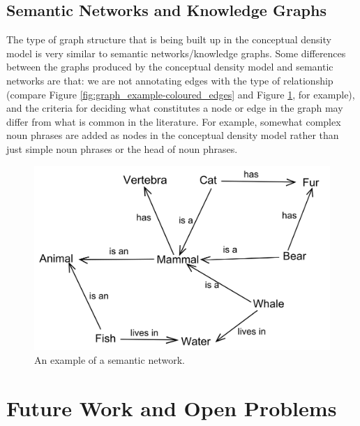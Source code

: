 \documentclass[12pt]{article}
\theoremstyle{grammarstyle}
\begin{document}
\subsection{Semantic Networks and Knowledge Graphs}
The type of graph structure that is being built up in the conceptual density model is very similar to semantic networks/knowledge graphs. Some differences between the graphs produced by the conceptual density model and semantic networks are that: we are not annotating edges with the type of relationship (compare Figure \ref{fig:graph_example-coloured_edges} and Figure \ref{fig:semantic_network_example}, for example), and the criteria for deciding what constitutes a node or edge in the graph may differ from what is common in the literature. For example, somewhat complex noun phrases are added as nodes in the conceptual density model rather than just simple noun phrases or the head of noun phrases.

\begin{figure}
    \centering
    \includegraphics[width=\linewidth]{reports/technical_report/latex/figures/semantic_map_example.png}
    \caption{An example of a semantic network.\protect\footnotemark}
    \label{fig:semantic_network_example}
\end{figure}


\section{Future Work and Open Problems} \label{sec:future_work}
\end{document}
